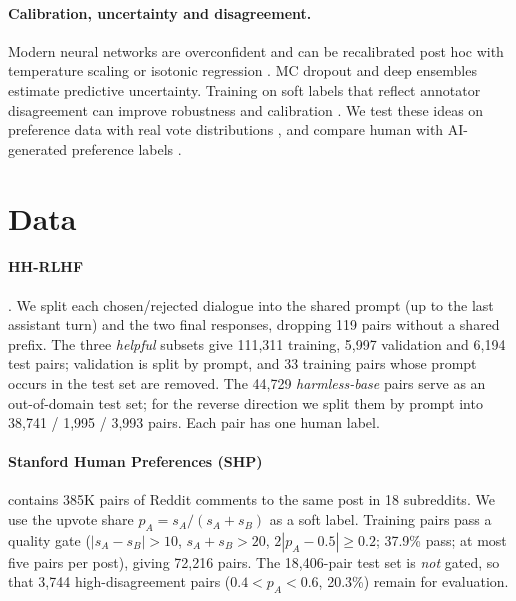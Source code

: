 \documentclass[11pt]{article}
\newcommand{\pa}{p_{A}}
\begin{document}
\paragraph{Calibration, uncertainty and disagreement.}
Modern neural networks are overconfident and can be recalibrated post hoc with temperature scaling \citep{guo2017calibration} or isotonic regression \citep{zadrozny2002transforming}. MC dropout \citep{gal2016dropout} and deep ensembles \citep{lakshminarayanan2017simple} estimate predictive uncertainty. Training on soft labels that reflect annotator disagreement can improve robustness and calibration \citep{peterson2019human,uma2021learning}. We test these ideas on preference data with real vote distributions \citep{ethayarajh2022understanding}, and compare human with AI-generated preference labels \citep{cui2024ultrafeedback}.

\section{Data}
\label{sec:data}

\paragraph{HH-RLHF} \citep{bai2022training}. We split each chosen/rejected dialogue into the shared prompt (up to the last assistant turn) and the two final responses, dropping 119 pairs without a shared prefix. The three \emph{helpful} subsets give 111,311 training, 5,997 validation and 6,194 test pairs; validation is split by prompt, and 33 training pairs whose prompt occurs in the test set are removed. The 44,729 \emph{harmless-base} pairs serve as an out-of-domain test set; for the reverse direction we split them by prompt into 38,741 / 1,995 / 3,993 pairs. Each pair has one human label.

\paragraph{Stanford Human Preferences (SHP)} \citep{ethayarajh2022understanding} contains 385K pairs of Reddit comments to the same post in 18 subreddits. We use the upvote share $\pa = s_A/(s_A+s_B)$ as a soft label. Training pairs pass a quality gate ($|s_A-s_B|>10$, $s_A+s_B>20$, $2|\pa-0.5|\geq0.2$; 37.9\% pass; at most five pairs per post), giving 72,216 pairs. The 18,406-pair test set is \emph{not} gated, so that 3,744 high-disagreement pairs ($0.4<\pa<0.6$, 20.3\%) remain for evaluation.
\end{document}

